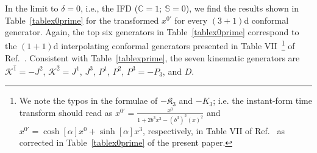 \documentclass[foundations,article,submit,pdftex,moreauthors]{Definitions/mdpi}
\newcommand{\pT}{\hat{+}}
\newcommand{\mT}{\hat{-}}
\begin{document}
\newcommand{\KinematicGeneratorTable}{%
    \begin{table}[!htbp]
    \resizebox{\textwidth}{!}{%
    \begin{tabular}{lcc}
	Interpolation angle & Kinematic & Dynamic \\
	\hline
	\rule{0pt}{3ex} $\delta=0$ & $\mathcal{K}^{\hat{1}}=-J^{2},~ \mathcal{K}^{\hat{2}}=J^{1},~ J^{3}, P^{1}, P^{2}, P^{3}$, $D$ & $\mathcal{D}^{\hat{1}}=-K^{1},~ \mathcal{D}^{\hat{2}}=-K^{2},~ K_{3}, P^{0}$, $\mathfrak{K}_{{0}}$, $\mathfrak{K}_{{1}}$, $\mathfrak{K}_{{2}}$, $\mathfrak{K}_{{3}}$\\
	$0<\delta<\pi/4$ &  $\mathcal{K}^{\hat{1}}, \mathcal{K}^{\hat{2}}, J^{3}, P^{1}, P^{2}$, $P_{\mT}$, $D=\left(D_{\hat{+}}c+D_{\hat{-}}s\right)$ &  $\mathcal{D}^{\hat{1}}, \mathcal{D}^{\hat{2}}$, $K_3=\left(D_{\hat{+}}s-D_{\hat{-}}c\right)$,  $P_{\pT}$, $\mathfrak{K}_{\hat{+}}$, $\mathfrak{K}_{1}$, $\mathfrak{K}_{2}$, $\mathfrak{K}_{\hat{-}}$\\
	$\delta=\pi/4$ & $\mathcal{K}^{\hat{1}}=-E^{1},~ \mathcal{K}^{\hat{2}}=-E^{2},~ J^{3}, P^{1}, P^{2}$, $P_{-}$, $D_{+}$, $D_{-}$& $\mathcal{D}^{\hat{1}}=-F^{1},~ \mathcal{D}^{\hat{2}}=-F^{2},~ P_{+}$, $\mathfrak{K}_{{+}}$, $\mathfrak{K}_{{-}}$, $\mathfrak{K}_{{1}}$, $\mathfrak{K}_{{2}}$\\
      \end{tabular}%
    }
    \caption{\label{tab:Kinematic_and_dynamic_generators_for_different_interoplation_angles_conformal1+1}Kinematic and dynamic conformal generators for different interpolation angles in $(3+1)$ dimensions. Here, kinematic means that the interpolating time is unchanged up to a scale factor independent of the spacetime coordinates. {Here $K_3$ denotes the longitudinal boost and $\mathfrak{K}_3$ the longitudinal special conformal generator.}}
\end{table}%
}
%


In the limit to $\delta=0$, i.e., the IFD ($\mathbb{C}=1;~\mathbb{S}=0$), we find the results shown in Table~\ref{tablex0prime} for the transformed $x^{0\prime}$ 
for every $(3+1)$d conformal generator. { Again, 
the top six generators in Table~\ref{tablex0prime} correspond to the $(1+1)$d interpolating conformal generators presented in Table VII~\footnote{We note the typos in the formulae of $-\mathfrak{K}_{{3}}$ and  $-K_{3}$;
i.e. the instant-form time transform should read as $x^{{0}\prime}=\frac{x^{{0}}}{1+2b^{{3}}x^{{3}}{-}(b^{{3}})^2(x)^2}$ and $x^{{0}\prime} = \cosh[\alpha]x^{0}+\sinh[\alpha] x^{3}$, respectively,
in Table VII of Ref.~\cite{Ji-Hari-2026-PRD} as corrected
in Table~\ref{tablex0prime} of the present paper.} of Ref.~\cite{Ji-Hari-2026-PRD}.} 
Consistent with Table~\ref{tablexprime}, the seven kinematic generators are $\mathcal{K}^{\hat{1}}=-J^{2}$, $\mathcal{K}^{\hat{2}}=J^{1}$, $J^{3}$, $P^{1}$, $P^{2}$, $P^{3}=-P_{3}$, and $D$.
\end{document}
